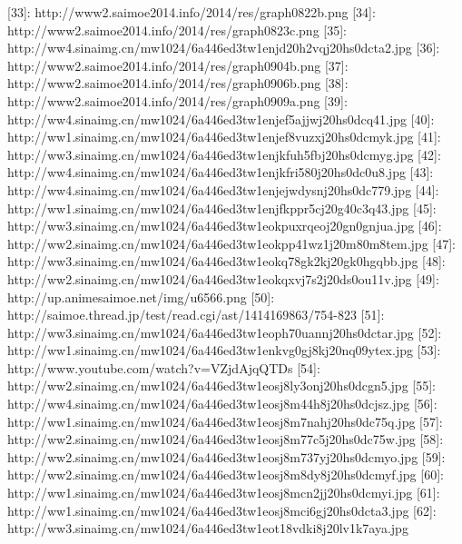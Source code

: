   [33]: http://www2.saimoe2014.info/2014/res/graph0822b.png
  [34]: http://www2.saimoe2014.info/2014/res/graph0823c.png
  [35]: http://ww4.sinaimg.cn/mw1024/6a446ed3tw1enjd20h2vqj20hs0dcta2.jpg
  [36]: http://www2.saimoe2014.info/2014/res/graph0904b.png
  [37]: http://www2.saimoe2014.info/2014/res/graph0906b.png
  [38]: http://www2.saimoe2014.info/2014/res/graph0909a.png
  [39]: http://ww4.sinaimg.cn/mw1024/6a446ed3tw1enjef5ajjwj20hs0dcq41.jpg
  [40]: http://ww1.sinaimg.cn/mw1024/6a446ed3tw1enjef8vuzxj20hs0dcmyk.jpg
  [41]: http://ww3.sinaimg.cn/mw1024/6a446ed3tw1enjkfuh5fbj20hs0dcmyg.jpg
  [42]: http://ww4.sinaimg.cn/mw1024/6a446ed3tw1enjkfri580j20hs0dc0u8.jpg
  [43]: http://ww4.sinaimg.cn/mw1024/6a446ed3tw1enjejwdysnj20hs0dc779.jpg
  [44]: http://ww1.sinaimg.cn/mw1024/6a446ed3tw1enjfkppr5cj20g40c3q43.jpg
  [45]: http://ww3.sinaimg.cn/mw1024/6a446ed3tw1eokpuxrqeoj20gn0gnjua.jpg
  [46]: http://ww2.sinaimg.cn/mw1024/6a446ed3tw1eokpp41wz1j20m80m8tem.jpg
  [47]: http://ww3.sinaimg.cn/mw1024/6a446ed3tw1eokq78gk2kj20gk0hgqbb.jpg
  [48]: http://ww2.sinaimg.cn/mw1024/6a446ed3tw1eokqxvj7s2j20ds0ou11v.jpg
  [49]: http://up.animesaimoe.net/img/u6566.png
  [50]: http://saimoe.thread.jp/test/read.cgi/ast/1414169863/754-823
  [51]: http://ww3.sinaimg.cn/mw1024/6a446ed3tw1eoph70uannj20hs0dctar.jpg
  [52]: http://ww1.sinaimg.cn/mw1024/6a446ed3tw1enkvg0gj8kj20nq09ytex.jpg
  [53]: http://www.youtube.com/watch?v=VZjdAjqQTDs
  [54]: http://ww2.sinaimg.cn/mw1024/6a446ed3tw1eosj8ly3onj20hs0dcgn5.jpg
  [55]: http://ww4.sinaimg.cn/mw1024/6a446ed3tw1eosj8m44h8j20hs0dcjsz.jpg
  [56]: http://ww1.sinaimg.cn/mw1024/6a446ed3tw1eosj8m7nahj20hs0dc75q.jpg
  [57]: http://ww2.sinaimg.cn/mw1024/6a446ed3tw1eosj8m77c5j20hs0dc75w.jpg
  [58]: http://ww2.sinaimg.cn/mw1024/6a446ed3tw1eosj8m737yj20hs0dcmyo.jpg
  [59]: http://ww2.sinaimg.cn/mw1024/6a446ed3tw1eosj8m8dy8j20hs0dcmyf.jpg
  [60]: http://ww1.sinaimg.cn/mw1024/6a446ed3tw1eosj8mcn2jj20hs0dcmyi.jpg
  [61]: http://ww1.sinaimg.cn/mw1024/6a446ed3tw1eosj8mci6gj20hs0dcta3.jpg
  [62]: http://ww3.sinaimg.cn/mw1024/6a446ed3tw1eot18vdki8j20lv1k7aya.jpg
